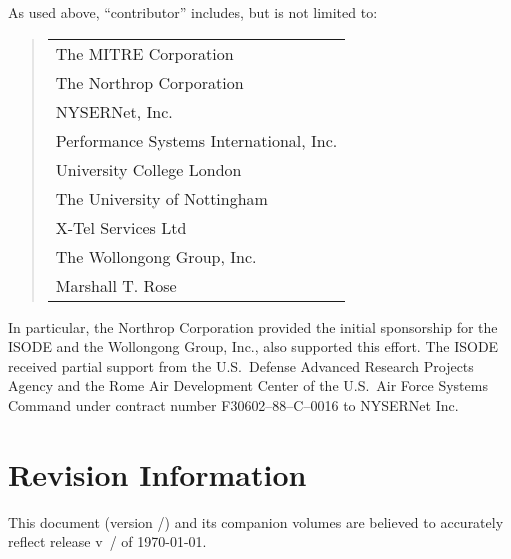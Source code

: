 \vskip 0.15in
\noindent
As used above,
``contributor'' includes, but is not limited to:
\begin{quote}
\begin{tabular}{l}
The MITRE Corporation\\
The Northrop Corporation\\
NYSERNet, Inc.\\
Performance Systems International, Inc.\\
University College London\\
The University of Nottingham\\
X-Tel Services Ltd\\
The Wollongong Group, Inc.\\
Marshall T. Rose
\end{tabular}
\end{quote}
In particular,
the Northrop Corporation provided the initial sponsorship for the ISODE
and the Wollongong Group, Inc., also supported this effort.
The ISODE received partial support from the U.S.~Defense Advanced Research
Projects Agency and the Rome Air Development Center of the U.S.~Air Force
Systems Command under contract number F30602--88--C--0016 to NYSERNet Inc.

\newpage\section*	{Revision Information}
This document (version \versiontag/) and its companion volumes are believed
to accurately reflect release v~\isodevrsn/ of \today{}.

